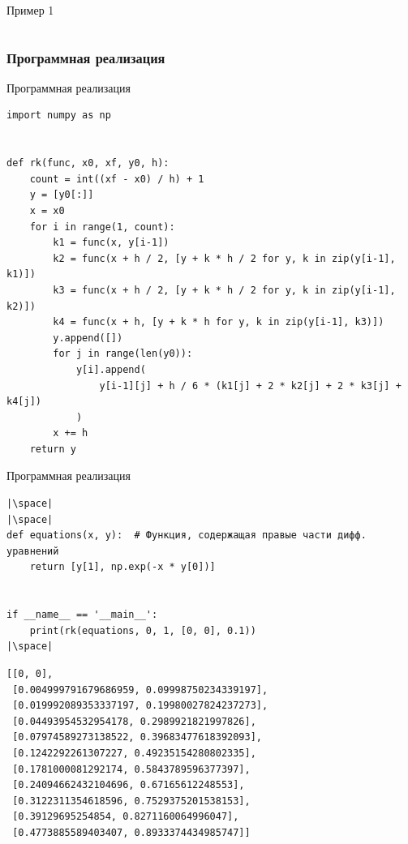 \documentclass[aspectratio=169, mathserif]{beamer}	%
\begin{document}
\begin{frame}[fragile, ]{Пример 1}
\begin{longtable}{|r|r|r|r|r|r|r|r|r|r|r|r|}
	\hline
\end{longtable}
\vfill
\end{frame}


\subsubsection{Программная реализация}
\begin{frame}[fragile, ]{Программная реализация}
\scriptsize
\begin{verbatim}
import numpy as np


def rk(func, x0, xf, y0, h):
    count = int((xf - x0) / h) + 1
    y = [y0[:]]
    x = x0
    for i in range(1, count):
        k1 = func(x, y[i-1])
        k2 = func(x + h / 2, [y + k * h / 2 for y, k in zip(y[i-1], k1)])
        k3 = func(x + h / 2, [y + k * h / 2 for y, k in zip(y[i-1], k2)])
        k4 = func(x + h, [y + k * h for y, k in zip(y[i-1], k3)])
        y.append([])
        for j in range(len(y0)):
            y[i].append(
                y[i-1][j] + h / 6 * (k1[j] + 2 * k2[j] + 2 * k3[j] + k4[j])
            )
        x += h
    return y
\end{verbatim}
\vfill
\end{frame}


\begin{frame}[fragile, ]{Программная реализация}
\scriptsize
\begin{verbatim}
|\space|
|\space|
def equations(x, y):  # Функция, содержащая правые части дифф. уравнений
    return [y[1], np.exp(-x * y[0])]


if __name__ == '__main__':
    print(rk(equations, 0, 1, [0, 0], 0.1))
|\space|
\end{verbatim}
\vfill
\begin{verbatim}
[[0, 0],
 [0.004999791679686959, 0.09998750234339197],
 [0.019992089353337197, 0.19980027824237273],
 [0.04493954532954178, 0.2989921821997826],
 [0.07974589273138522, 0.39683477618392093],
 [0.1242292261307227, 0.49235154280802335],
 [0.1781000081292174, 0.5843789596377397],
 [0.24094662432104696, 0.67165612248553],
 [0.3122311354618596, 0.7529375201538153],
 [0.39129695254854, 0.8271160064996047],
 [0.4773885589403407, 0.8933374434985747]]
\end{verbatim}
\vfill
\end{frame}
\end{document}
